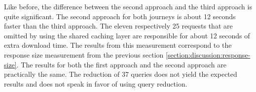\noindent Like before, the difference between the second approach and the third approach is quite significant. The second approach for both journeys is about 12 seconds faster than the third approach. The eleven respectively 25 requests that are omitted by using the shared caching layer are responsible for about 12 seconds of extra download time. The results from this measurement correspond to the response size measurement from the previous section \ref{section:discussion:response-size}. The results for both the first approach and the second approach are practically the same. The reduction of 37 queries does not yield the expected results and does not speak in favor of using query reduction.